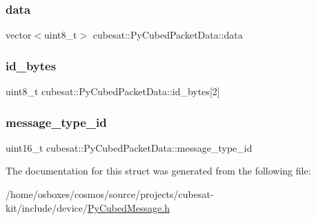 \subsubsection{\texorpdfstring{data}{data}}
{\footnotesize\ttfamily vector$<$uint8\+\_\+t$>$ cubesat\+::\+Py\+Cubed\+Packet\+Data\+::data}

\mbox{\label{structcubesat_1_1PyCubedPacketData_ac838d716cfc7c6252dff158668b6291a}} 
\subsubsection{\texorpdfstring{id\+\_\+bytes}{id\_bytes}}
{\footnotesize\ttfamily uint8\+\_\+t cubesat\+::\+Py\+Cubed\+Packet\+Data\+::id\+\_\+bytes\mbox{[}2\mbox{]}}

\mbox{\label{structcubesat_1_1PyCubedPacketData_a02926763ed43d1a5fea510f63644b5cf}} 
\subsubsection{\texorpdfstring{message\+\_\+type\+\_\+id}{message\_type\_id}}
{\footnotesize\ttfamily uint16\+\_\+t cubesat\+::\+Py\+Cubed\+Packet\+Data\+::message\+\_\+type\+\_\+id}



The documentation for this struct was generated from the following file\+:\begin{DoxyCompactItemize}
\item 
/home/osboxes/cosmos/source/projects/cubesat-\/kit/include/device/\hyperlink{PyCubedMessage_8h}{Py\+Cubed\+Message.\+h}\end{DoxyCompactItemize}
